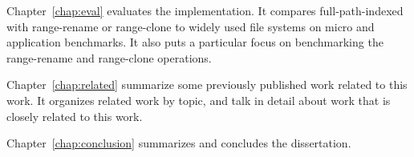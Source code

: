 Chapter~\ref{chap:eval} evaluates the implementation.
It compares full-path-indexed \betrfs with range-rename or range-clone to
widely used file systems on micro and application benchmarks.
It also puts a particular focus on benchmarking the range-rename and range-clone
operations.

Chapter~\ref{chap:related} summarize some previously published work related to
this work.
It organizes related work by topic, and talk in detail about work that is closely
related to this work.

Chapter~\ref{chap:conclusion} summarizes and concludes the dissertation.

